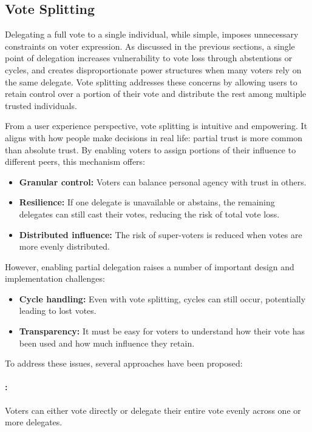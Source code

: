 \subsection*{Vote Splitting}\label{subsec:vote_splitting_background}

Delegating a full vote to a single individual, while simple, imposes unnecessary constraints on voter expression. As discussed in the previous sections, a single point of delegation increases vulnerability to vote loss through abstentions or cycles, and creates disproportionate power structures when many voters rely on the same delegate. Vote splitting addresses these concerns by allowing users to retain control over a portion of their vote and distribute the rest among multiple trusted individuals.

From a user experience perspective, vote splitting is intuitive and empowering. It aligns with how people make decisions in real life: partial trust is more common than absolute trust. By enabling voters to assign portions of their influence to different peers, this mechanism offers:
\begin{itemize}
  \item \textbf{Granular control:} Voters can balance personal agency with trust in others.
  \item \textbf{Resilience:} If one delegate is unavailable or abstains, the remaining delegates can still cast their votes, reducing the risk of total vote loss.
  \item \textbf{Distributed influence:} The risk of super-voters is reduced when votes are more evenly distributed.
\end{itemize}

However, enabling partial delegation raises a number of important design and implementation challenges:
\begin{itemize}
  \item \textbf{Cycle handling:} Even with vote splitting, cycles can still occur, potentially leading to lost votes.
  \item \textbf{Transparency:} It must be easy for voters to understand how their vote has been used and how much influence they retain.
\end{itemize}

To address these issues, several approaches have been proposed:

\paragraph{\cite{degrave}: }
Voters can either vote directly or delegate their entire vote evenly across one or more delegates. 

